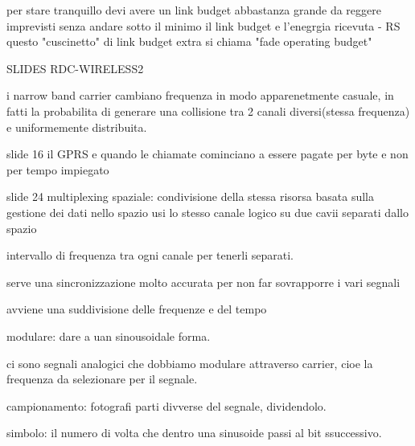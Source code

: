 \documentclass[12pt]{article}
\begin{document}
per stare tranquillo devi avere un link budget abbastanza grande da reggere imprevisti senza andare sotto il minimo
il link budget e l'enegrgia ricevuta - RS
questo "cuscinetto" di link budget extra si chiama "fade operating budget"

SLIDES RDC-WIRELESS2

i narrow band carrier cambiano frequenza in modo apparenetmente casuale, in fatti la probabilita di generare una collisione tra 2 canali diversi(stessa frequenza) e uniformemente distribuita.

slide 16 il GPRS e quando le chiamate cominciano a essere pagate per byte e non per tempo impiegato

slide 24 multiplexing spaziale: condivisione della stessa risorsa basata sulla gestione dei dati nello spazio
usi lo stesso canale logico su due cavii separati dallo spazio

intervallo di frequenza tra ogni canale per tenerli separati.

serve una sincronizzazione molto accurata per non far sovrapporre i vari segnali

avviene una suddivisione delle frequenze e del tempo

modulare: dare a uan sinousoidale forma.

ci sono segnali analogici che dobbiamo modulare attraverso carrier, cioe la frequenza da selezionare per il segnale.

campionamento: fotografi parti divverse del segnale, dividendolo.

simbolo: il numero di volta che dentro una sinusoide passi al bit ssuccessivo.
\end{document}
